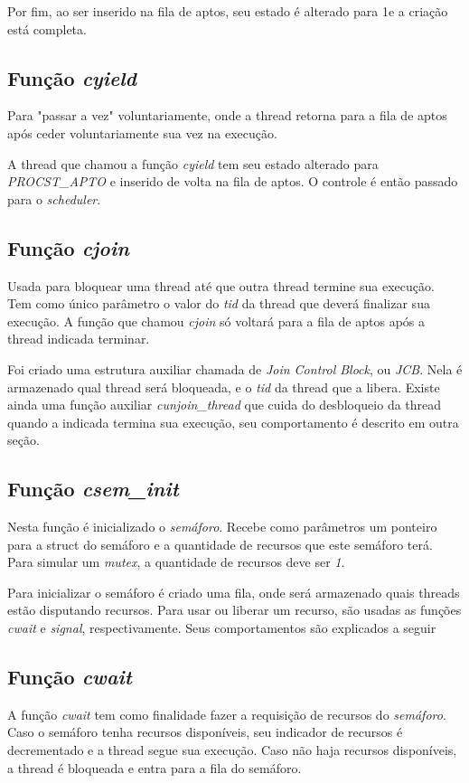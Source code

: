 \documentclass{article}
\begin{document}
Por fim,  ao ser inserido na fila de aptos, seu estado é alterado para 1\footnotemark e a criação está completa.

\subsection{Função \textit{cyield}}
Para "passar a vez" voluntariamente, onde a thread retorna para a fila de aptos após ceder voluntariamente sua vez na execução.

A thread que chamou a função \textit{cyield} tem seu estado alterado para \textit{PROCST\_APTO} e inserido de volta na fila de aptos. O controle é então passado para o \textit{scheduler}.

\subsection{Função \textit{cjoin}}
Usada para bloquear uma thread até que outra thread termine sua execução. Tem como único parâmetro o valor do \textit{tid} da thread que deverá finalizar sua execução.
A função que chamou \textit{cjoin} só voltará para a fila de aptos após a thread indicada terminar.

Foi criado uma estrutura auxiliar chamada de \textit{Join Control Block}, ou \textit{JCB}. Nela é armazenado qual thread será bloqueada, e o \textit{tid} da thread que a libera. Existe ainda uma função auxiliar \textit{cunjoin\_thread} que cuida do desbloqueio da thread quando a indicada termina sua execução, seu comportamento é descrito em outra seção.

\subsection{Função \textit{csem\_init}}
Nesta função é inicializado o \textit{semáforo}. Recebe como parâmetros um ponteiro para a struct do semáforo e a quantidade de recursos que este semáforo terá. Para simular um \textit{mutex}, a quantidade de recursos deve ser \textit{1}.

Para inicializar o semáforo é criado uma fila, onde será armazenado quais threads estão disputando recursos. Para usar ou liberar um recurso, são usadas as funções \textit{cwait} e \textit{signal}, respectivamente. Seus comportamentos são explicados a seguir

\subsection{Função \textit{cwait}}
A função \textit{cwait} tem como finalidade fazer a requisição de recursos do \textit{semáforo}. Caso o semáforo tenha recursos disponíveis, seu indicador de recursos é decrementado e a thread segue sua execução. Caso não haja recursos disponíveis, a thread é bloqueada e entra para a fila do semáforo.
\end{document}
